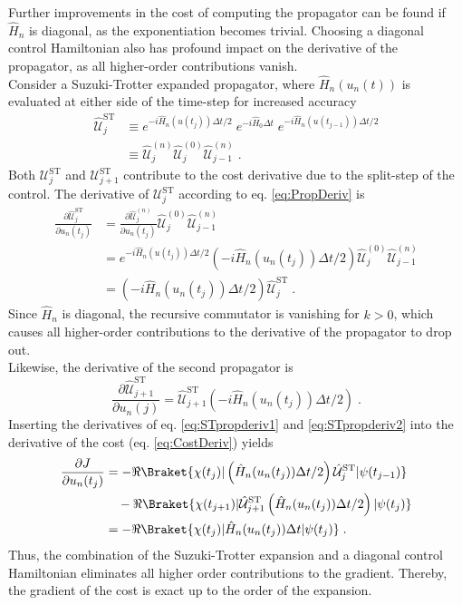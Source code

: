 Further improvements in the cost of computing the propagator can be found if $\hat{H}_n$ is diagonal, as the exponentiation becomes trivial. Choosing a diagonal control Hamiltonian also has profound impact on the  derivative of the propagator, as all higher-order contributions vanish.\\
Consider a Suzuki-Trotter expanded propagator, where $\hat{H}_n (u_n (t))$ is evaluated at either side of the time-step for increased accuracy
\begin{align}
	\hat{\mathcal{U}}_{j}^{\mathrm{ST}} &\equiv e^{ -i  \hat{H}_n (u (t_j)) \Delta t /2 } \; e^{ -i \hat{H}_0 \Delta t } \; e^{ -i  \hat{H}_n (u (t_{j-1}))  \Delta t /2 } \\
	& \equiv \hat{\mathcal{U}}_{j}^{(n)} \hat{\mathcal{U}}_{j}^{(0)} \hat{\mathcal{U}}_{j-1}^{(n)} \; .
\end{align}
Both $\mathcal{U}_{j}^{\mathrm{ST}}$ and $\mathcal{U}_{j+1}^{\mathrm{ST}}$ contribute to the cost derivative due to the split-step of the control.
The derivative of $\mathcal{U}_{j}^{\mathrm{ST}}$ according to eq. \eqref{eq:PropDeriv} is
\begin{align}
	\frac{\partial \hat{\mathcal{U}}_{j}^{\mathrm{ST}}}{\partial u_n (t_j)} &=  \frac{\partial \hat{\mathcal{U}}_{j}^{(n)}}{\partial u_n (t_j)} \hat{\mathcal{U}}_{j}^{(0)} \hat{\mathcal{U}}_{j-1}^{(n)} \nonumber \\
	&= e^{ -i  \hat{H}_n (u (t_j)) \Delta t /2 } \left( -i \hat{H}_n (u_n (t_j)) \Delta t /2 \right) \hat{\mathcal{U}}_{j}^{(0)} \hat{\mathcal{U}}_{j-1}^{(n)} \nonumber \\
	&= \left( -i \hat{H}_n (u_n (t_j)) \Delta t /2 \right) \hat{\mathcal{U}}_{j}^{\mathrm{ST}} \; . \label{eq:STpropderiv1}
\end{align}
Since $\hat{H}_n$ is diagonal, the recursive commutator is vanishing for $k > 0$, which causes all higher-order contributions to the derivative of the propagator to drop out.\\
Likewise, the derivative of the second propagator is
\begin{equation}
	\frac{\partial \hat{\mathcal{U}}_{j+1}^{\mathrm{ST}}}{\partial u_n (j)} =  \hat{\mathcal{U}}_{j+1}^{\mathrm{ST}} \left( -i \hat{H}_n (u_n (t_j)) \Delta t /2 \right) \; . \label{eq:STpropderiv2}
\end{equation}
Inserting the derivatives of eq. \eqref{eq:STpropderiv1} and \eqref{eq:STpropderiv2} into the derivative of the cost (eq. \eqref{eq:CostDeriv}) yields
\begin{align}
	\frac{\partial J}{\partial u_n (t_j)} &= - \Re \Braket{\chi (t_j) |  \left(  \hat{H}_n (u_n (t_j)) \Delta t /2 \right) \hat{\mathcal{U}}_{j}^{\mathrm{ST}} | \psi (t_{j-1})} \nonumber \\
	& \quad - \Re \Braket{\chi (t_{j+1}) | \hat{\mathcal{U}}_{j+1}^{\mathrm{ST}} \left(  \hat{H}_n (u_n (t_j)) \Delta t /2 \right) | \psi (t_{j})} \nonumber \\
	&= - \Re \Braket{\chi (t_j) | \hat{H}_n (u_n (t_j)) \Delta t | \psi (t_{j})} \; . \label{eq:STcostgrad}
\end{align}  
Thus, the combination of the Suzuki-Trotter expansion and a diagonal control Hamiltonian eliminates all higher order contributions to the gradient. Thereby, the gradient of the cost is exact up to the order of the expansion.